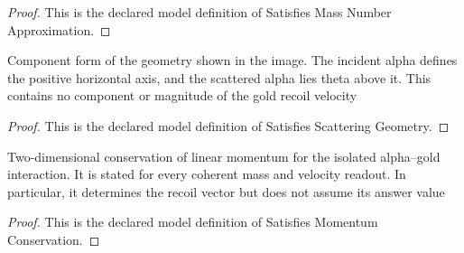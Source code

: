 \begin{proof}
  This is the declared model definition of Satisfies Mass Number Approximation.
\end{proof}
\begin{definition}
  \label{def:physics:phyx-mini-0497:phyxminiproblems-problemphyxmini0497-satisfiesscatteringgeometry}
  Component form of the geometry shown in the image. The incident alpha defines the positive horizontal axis, and the scattered alpha lies theta above it. This contains no component or magnitude of the gold recoil velocity
\end{definition}
\begin{proof}
  This is the declared model definition of Satisfies Scattering Geometry.
\end{proof}
\begin{definition}
  \label{def:physics:phyx-mini-0497:phyxminiproblems-problemphyxmini0497-satisfiesmomentumconservation}
  Two-dimensional conservation of linear momentum for the isolated alpha--gold interaction. It is stated for every coherent mass and velocity readout. In particular, it determines the recoil vector but does not assume its answer value
\end{definition}
\begin{proof}
  This is the declared model definition of Satisfies Momentum Conservation.
\end{proof}
